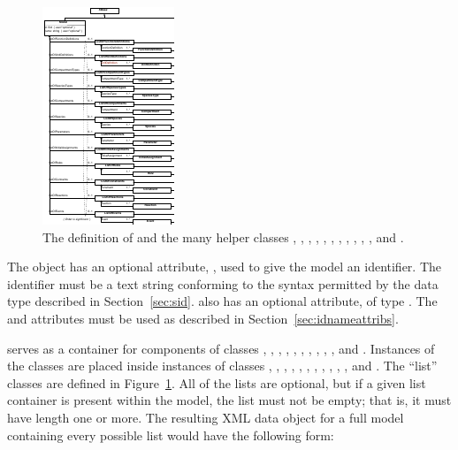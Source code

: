 \begin{figure}[htb]
  \centering
  \vspace*{-2ex}
  \includegraphics[scale=0.755]{figs/model-uml}
  \vspace*{-1.1ex}
  \caption{The definition of \Model and the many helper
      classes \ListOfFunctionDefinitions, \ListOfUnitDefinitions,
      \ListOfCompartmentTypes, \ListOfSpeciesTypes,
      \ListOfCompartments, \ListOfSpecies, \ListOfParameters,
      \ListOfInitialAssignments, \ListOfRules, \ListOfConstraints,
      \ListOfReactions, and \ListOfEvents.}
  \label{fig:model}
\end{figure}

The \Model object has an optional attribute, , used to
give the model an identifier.  The identifier must be a text
string conforming to the syntax permitted by the 
data type described in Section~\ref{sec:sid}.  \Model also has an
optional  attribute, of type .  The
 and  attributes must be used as described in
Section~\ref{sec:idnameattribs}.

\Model serves as a container for components of classes
\FunctionDefinition, \UnitDefinition, \CompartmentType,
\SpeciesType, \Compartment, \Species, \Parameter,
\InitialAssignment, \Rule, \Constraint, \Reaction and \Event.
Instances of the classes are placed inside instances of classes
\ListOfFunctionDefinitions, \ListOfUnitDefinitions,
\ListOfCompartmentTypes, \ListOfSpeciesTypes, \ListOfCompartments,
\ListOfSpecies, \ListOfParameters, \ListOfInitialAssignments,
\ListOfRules, \ListOfConstraints, \ListOfReactions, and
\ListOfEvents.  The ``list'' classes are defined in
Figure~\ref{fig:model}.  All of the lists are optional, but if a
given list container is present within the model, the list must
not be empty; that is, it must have length one or more.  The
resulting XML data object for a full model containing every
possible list would have the following form:

